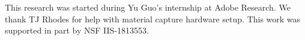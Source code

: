 \begin{acks}
	This research was started during Yu Guo's internship at Adobe Research. We thank TJ Rhodes for help with material capture hardware setup. This work was supported in part by NSF IIS-1813553.
\end{acks}
